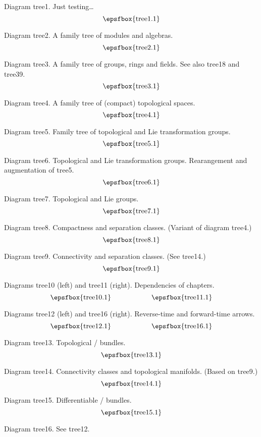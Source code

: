 Diagram tree1. Just testing\dots
$$
\centerline{\epsfbox{tree1.1}}
$$

Diagram tree2. A family tree of modules and algebras.
$$
\centerline{\epsfbox{tree2.1}}
$$

Diagram tree3. A family tree of groups, rings and fields. See also tree18 and
tree39.
$$
\centerline{\epsfbox{tree3.1}}
$$

\filleject

Diagram tree4. A family tree of (compact) topological spaces.
$$
\centerline{\epsfbox{tree4.1}}
$$

Diagram tree5. Family tree of topological and Lie transformation groups.
$$
\centerline{\epsfbox{tree5.1}}
$$

Diagram tree6. Topological and Lie transformation groups. Rearangement and
augmentation of tree5.
$$
\centerline{\epsfbox{tree6.1}}
$$

Diagram tree7. Topological and Lie groups.
$$
\centerline{\epsfbox{tree7.1}}
$$

\filleject

Diagram tree8. Compactness and separation classes. (Variant of diagram tree4.)
$$
\centerline{\epsfbox{tree8.1}}
$$

Diagram tree9. Connectivity and separation classes. (See tree14.)
$$
\centerline{\epsfbox{tree9.1}}
$$

Diagrams tree10 (left) and tree11 (right). Dependencies of chapters.
$$
\centerline{\epsfbox{tree10.1}\hss\epsfbox{tree11.1}}
$$

\filleject

Diagrams tree12 (left) and tree16 (right). Reverse-time and forward-time arrows.
$$
\centerline{\epsfbox{tree12.1}\hss\epsfbox{tree16.1}}
$$

Diagram tree13. Topological \fibre/ bundles.
$$
\centerline{\epsfbox{tree13.1}}
$$

Diagram tree14. Connectivity classes and topological manifolds. (Based on
tree9.)
$$
\centerline{\epsfbox{tree14.1}}
$$

\filleject

Diagram tree15. Differentiable \fibre/ bundles.
$$
\centerline{\epsfbox{tree15.1}}
$$

Diagram tree16. See tree12.

